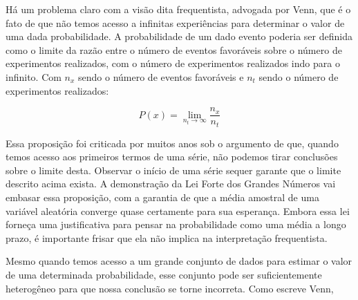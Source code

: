 Há um problema claro com a visão dita frequentista, advogada por Venn, que é o fato de que não temos 
acesso a infinitas experiências para determinar o valor
de uma dada probabilidade. 
A probabilidade de um dado evento poderia ser definida como o limite da razão entre o número de eventos
favoráveis sobre o número de experimentos realizados, com o número de experimentos realizados indo para o infinito. Com 
$n_x$ sendo o número de eventos favoráveis e $n_t$ sendo o número de experimentos realizados:

\begin{equation}
	P(x) = \lim_{n_t \rightarrow \infty} \frac{n_x}{n_t} 
\end{equation}

Essa proposição foi criticada por muitos anos sob o argumento de que, quando temos acesso aos primeiros termos de uma série,
não podemos tirar conclusões sobre o limite desta. 
Observar o início de uma série sequer garante que o limite descrito 
acima exista. A demonstração da Lei Forte dos Grandes Números \citep{Loeve77} vai embasar essa proposição, com a garantia de 
que a média amostral de uma variável aleatória converge quase certamente para sua esperança. Embora essa lei forneça uma
justificativa para pensar na probabilidade como uma média a longo prazo, é importante frisar que ela não implica na
interpretação frequentista. %

Mesmo quando temos acesso a um grande conjunto de dados para estimar o valor de uma determinada
probabilidade, esse conjunto pode ser suficientemente heterogêneo para que nossa conclusão se torne incorreta. Como escreve Venn,


